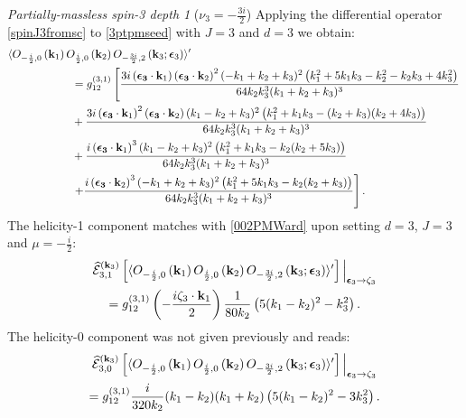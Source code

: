 \documentclass[11pt,a4paper]{article}
\begin{document}
\emph{Partially-massless spin-3 depth 1} ($\nu_3 = -\tfrac{3i}{2}$)
Applying the differential operator \eqref{spinJ3fromsc} to \eqref{3ptpmseed} with $J=3$ and $d=3$ we obtain:
\begin{align}
    & \langle O_{-\frac{i}{2},0}\left({\bf k}_1\right)O_{\frac{i}{2},0}\left({\bf k}_2\right)O_{-\frac{3i}{2},2}\left({\bf k}_3;\boldsymbol{\epsilon}_3\right)  \rangle^\prime \\
    & \hspace*{2cm} = g^{\left(3,1\right)}_{12}\left[ \frac{3 i \left(\boldsymbol{\epsilon_3} \cdot {\bf k}_1\right)\left(\boldsymbol{\epsilon_3} \cdot {\bf k}_2\right)^2 (-k_1+k_2+k_3)^2 \left(k^2_1+5 k_1 k_3-k^2_2-k_2 k_3+4 k^2_3\right)}{64 k_2 k^3_3 (k_1+k_2+k_3)^3}\nonumber \right. \\
    &\hspace*{2cm}+\frac{3 i \left(\boldsymbol{\epsilon_3} \cdot {\bf k}_1\right)^2 \left(\boldsymbol{\epsilon_3} \cdot {\bf k}_2\right) (k_1-k_2+k_3)^2 \left(k^2_1+k_1 k_3-(k_2+k_3) (k_2+4k_3)\right)}{64 k_2 k^3_3 (k_1+k_2+k_3)^3}\nonumber \\&\hspace*{2cm}+\frac{i \left(\boldsymbol{\epsilon_3} \cdot {\bf k}_1\right)^3 (k_1-k_2+k_3)^2 \left(k^2_1+k_1 k_3-k_2 (k_2+5 k_3)\right)}{64 k_2 k^3_3 (k_1+k_2+k_3)^3}\nonumber\\&\hspace*{2cm}\left.+\frac{i \left(\boldsymbol{\epsilon_3} \cdot {\bf k}_2\right)^3  (-k_1+k_2+k_3)^2 \left(k^2_1+5 k_1 k_3-k_2 (k_2+k_3)\right)}{64 k_2 k^3_3 (k_1+k_2+k_3)^3}\right]. \nonumber
\end{align}
The helicity-1 component matches with \eqref{002PMWard} upon setting $d=3$, $J=3$ and $\mu = -\tfrac{i}{2}$:
\begin{multline}
    \widehat{\mathcal{E}}^{({\bf k}_3)}_{3,1}\left[\langle O_{-\frac{i}{2},0}\left({\bf k}_1\right)O_{\frac{i}{2},0}\left({\bf k}_2\right)O_{-\frac{3i}{2},2}\left({\bf k}_3;\boldsymbol{\epsilon}_3\right)  \rangle^\prime\right]\Big|_{\boldsymbol{\epsilon}_3 \to \zeta_3} \\ = g^{\left(3,1\right)}_{12}\left(-\frac{i \zeta_3 \cdot {\bf k}_1}{2}\right)\frac{1}{80k_2}\left(5 (k_1-k_2)^2-k^2_3\right).
\end{multline}
The helicity-0 component was not given previously and reads:
\begin{multline}
   \widehat{\mathcal{E}}^{({\bf k}_3)}_{3,0}\left[\langle O_{-\frac{i}{2},0}\left({\bf k}_1\right)O_{\frac{i}{2},0}\left({\bf k}_2\right)O_{-\frac{3i}{2},2}\left({\bf k}_3;\boldsymbol{\epsilon}_3\right)  \rangle^\prime\right]\Big|_{\boldsymbol{\epsilon}_3 \to \zeta_3} \\ = g^{\left(3,1\right)}_{12} \frac{i}{320 k_2} (k_1-k_2) (k_1+k_2) \left(5 (k_1-k_2)^2-3 k^2_3\right).
\end{multline}
\end{document}
